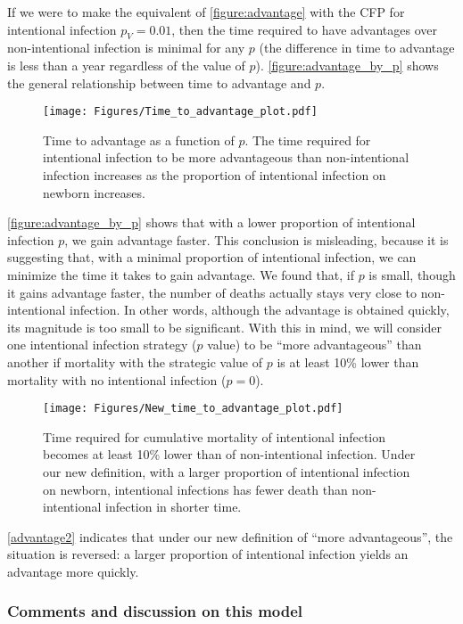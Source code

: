 \documentclass[12pt]{article}
\newcommand{\pmV}{p_{V}}
\begin{document}
If we were to make the equivalent of \autoref{figure:advantage} with the CFP for intentional infection $\pmV=0.01$, then the time required to have advantages over non-intentional infection is minimal for any $p$ (the difference in time to advantage is less than a year regardless of the value of $p$).
\autoref{figure:advantage_by_p} shows the general relationship between time to advantage and $p$.

\begin{figure}[H]
  \centering
  \texttt{[image: Figures/Time\_to\_advantage\_plot.pdf]}
  \caption{Time to advantage as a function of $p$. The time required for intentional infection to be more advantageous than non-intentional infection increases as the proportion of intentional infection on newborn increases.}
\label{figure:advantage_by_p}
\end{figure}

\autoref{figure:advantage_by_p} shows that with a lower proportion of intentional infection $p$, we gain advantage faster. This conclusion is misleading, because it is suggesting that, with a minimal proportion of intentional infection, we can minimize the time it takes to gain advantage.
We found that, if $p$ is small, though it gains advantage faster, the number of deaths actually stays very close to non-intentional infection. In other words, although the advantage is obtained quickly, its magnitude is too small to be significant.  With this in mind, we will consider one intentional infection strategy ($p$ value) to be ``more advantageous'' than another if mortality with the strategic value of $p$ is at least 10\% lower than mortality with no intentional infection ($p=0$).

\begin{figure}[H]
  \caption{Time required for cumulative mortality of intentional infection becomes at least 10\% lower than of non-intentional infection. Under our new definition, with a larger proportion of intentional infection on newborn, intentional infections has fewer death than non-intentional infection in shorter time.}\label{advantage2}
  \centering
  \texttt{[image: Figures/New\_time\_to\_advantage\_plot.pdf]}
\end{figure}
\autoref{advantage2} indicates that under our new definition of ``more advantageous'', the situation is reversed: a larger proportion of intentional infection yields an advantage more quickly.

\subsubsection{Comments and discussion on this model}
\end{document}
